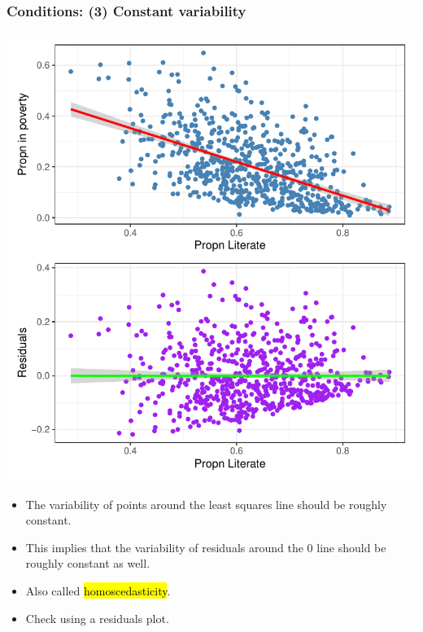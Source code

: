 \documentclass[notes,11pt, aspectratio=169]{beamer}
\begin{document}
\begin{frame}
\frametitle{Conditions: (3) Constant variability}

{
\begin{center}
\includegraphics[width=\textwidth]{graphs/l08f11}
\end{center}
}
{
\begin{itemize}

\item The variability of points around the least squares line should be roughly constant.

\pause

\item This implies that the variability of residuals around the 0 line should be roughly constant as well.

\pause

\item Also called \hl{homoscedasticity}.

\pause

\item Check using a residuals plot.

\end{itemize}
}


\end{frame}
\end{document}
